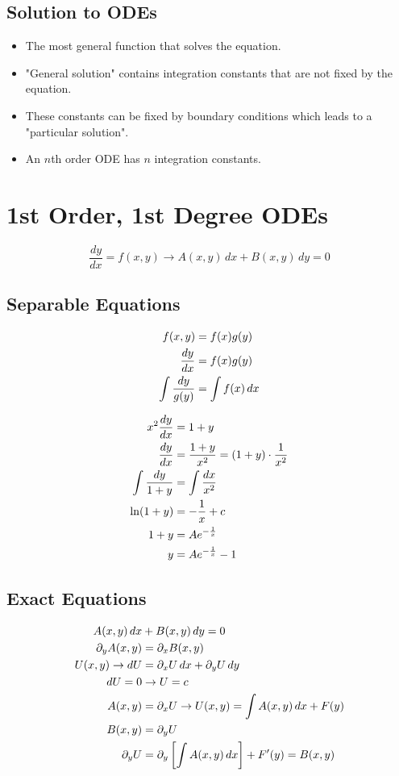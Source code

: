 \documentclass[Maths.tex]{subfiles}
\begin{document}
\subsection{Solution to ODEs}
\begin{itemize}
    \item The most general function that solves the equation.
    \item "General solution" contains integration constants that are not fixed by the equation.
    \item These constants can be fixed by boundary conditions which leads to a "particular solution".
    \item An $n$th order ODE has $n$ integration constants.
\end{itemize}

\section{1st Order, 1st Degree ODEs}
\begin{equation}
    \frac{dy}{dx} = f(x,y) \to A(x,y)\,dx + B(x,y)\,dy = 0
\end{equation}

\subsection{Separable Equations}
\begin{align}
    f(x,y) &= f(x)g(y) \\
    \frac{dy}{dx} &= f(x)g(y) \\
    \int \frac{dy}{g(y)} &= \int f(x)\,dx
\end{align}

\begin{example}
    \begin{align}
        x^2 \frac{dy}{dx} &= 1 + y \\
        \frac{dy}{dx} &= \frac{1 + y}{x^2} = (1 + y) \cdot \frac{1}{x^2} \\
        \int \frac{dy}{1 + y} &= \int \frac{dx}{x^2} \\
        \ln(1 + y) &= -\frac{1}{x} + c \\
        1 + y &= Ae^{-\frac{1}{x}} \\
        y &= Ae^{-\frac{1}{x}} - 1
    \end{align}
\end{example}

\subsection{Exact Equations}
\begin{align}
    A(x,y)\,dx &+ B(x,y)\,dy = 0 \\
    \partial_yA(x,y) &= \partial_xB(x,y) \\
    U(x,y) \to dU &= \partial_xU\,dx + \partial_yU\,dy \\
    dU = 0 &\to U = c \\
    A(x,y) &= \partial_xU \to U(x,y) = \int A(x,y)\,dx + F(y) \\
    B(x,y) &= \partial_yU  \\
    \partial_yU &= \partial_y \left[\int A(x,y)\,dx \right] + F'(y) = B(x,y)
\end{align}
\end{document}
